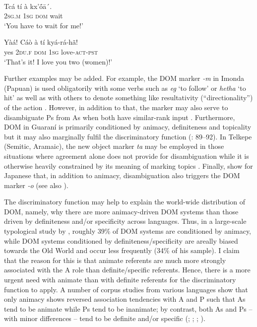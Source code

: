 \documentclass[output=paper]{langsci/langscibook}
\begin{document}
\ea\label{ex:serzant:}
\\
\ea
\gll  Tcá   tí   à   kx’ṓā´.\\
     \textsc{2sg.m}   \textsc{1sg}   \textsc{dom}  wait\\
\glt ‘You have to wait for me!’

\ex
\gll Yàá!   Cáò   à   tí   kyá-rá-hã!\\
     yes   \textsc{2du.f}   \textsc{dom}  \textsc{1sg}  love-\textsc{act-pst}\\
\glt ‘That’s it! I love you two (women)!’
\z
\z

Further examples may be added. For example, the DOM marker \textit{{}-m} in Imonda (Papuan) is used obligatorily with some verbs such as \textit{eg} ‘to follow’ or \textit{hetha} ‘to hit’ as well as with others to denote something like resultativity (“directionality”) of the action \citep[163]{Seiler1985}. However, in addition to that, the marker may also serve to disambiguate Ps from As when both have similar-rank input \citep[165]{Seiler1985}. Furthermore, DOM in Guaraní is primarily conditioned by animacy, definiteness and topicality but it may also marginally fulfil the discriminatory function (\citealt{Shain2009}: 89–92). In Telkepe (Semitic, Aramaic), the new object marker \textit{ta} may be employed in those situations where agreement alone does not provide for disambiguation while it is otherwise heavily constrained by its meaning of marking topics \citep[354]{Coghill2014}. Finally, \citet{KurumadaJaeger2015} show for Japanese that, in addition to animacy, disambiguation also triggers the DOM marker \textit{{}-o} (see also \citealt{FedzechkinaEtAl2012}).

The discriminatory function may help to explain the world-wide distribution of DOM, namely, why there are more animacy-driven DOM systems than those driven by definiteness and/or specificity across languages. Thus, in a large-scale typological study by \citet[295]{Sinnemäki2014}, roughly 39\% of DOM systems are conditioned by animacy, while DOM systems conditioned by definiteness/specificity are areally biased towards the Old World and occur less frequently (34\% of his sample). I claim that the reason for this is that animate referents are much more strongly associated with the A role than definite/specific referents. Hence, there is a more urgent need with animate than with definite referents for the discriminatory function to apply. A number of corpus studies from various languages show that only animacy shows reversed association tendencies with A and P such that As tend to be animate while Ps tend to be inanimate; by contrast, both As and Ps – with minor differences – tend to be definite and/or specific (\citealt{Dahl2000}; \citealt{Hofling2003}; \citealt{Everett2009}; \citealt{FauconnierVerstraete2014}). 
\end{document}
